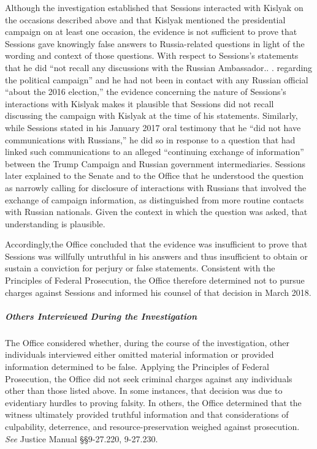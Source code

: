 Although the investigation established that Sessions interacted with Kislyak on the occasions described above and that Kislyak mentioned the presidential campaign on at least one occasion, the evidence is not sufficient to prove that Sessions gave knowingly false answers to Russia-related questions in light of the wording and context of those questions.
With respect to Sessions's statements that he did ``not recall any discussions with the Russian Ambassador.. . regarding the political campaign'' and he had not been in contact with any Russian official ``about the 2016 election,'' the evidence concerning the nature of Sessions's interactions with Kislyak makes it plausible that Sessions did not recall discussing the campaign with Kislyak at the time of his statements.
Similarly, while Sessions stated in his January 2017 oral testimony that he ``did not have communications with Russians,'' he did so in response to a question that had linked such communications to an alleged ``continuing exchange of information'' between the Trump Campaign and Russian government intermediaries.
Sessions later explained to the Senate and to the Office that he understood the question as narrowly calling for disclosure of interactions with Russians that involved the exchange of campaign information, as distinguished from more routine contacts with Russian nationals.
Given the context in which the question was asked, that understanding is plausible.

Accordingly,the Office concluded that the evidence was insufficient to prove that Sessions was willfully untruthful in his answers and thus insufficient to obtain or sustain a conviction for perjury or false statements.
Consistent with the Principles of Federal Prosecution, the Office therefore determined not to pursue charges against Sessions and informed his counsel of that decision in March 2018.

\subparagraph{Others Interviewed During the Investigation}
The Office considered whether, during the course of the investigation, other individuals interviewed either omitted material information or provided information determined to be false.
Applying the Principles of Federal Prosecution, the Office did not seek criminal charges against any individuals other than those listed above.
In some instances, that decision was due to evidentiary hurdles to proving falsity.
In others, the Office determined that the witness ultimately provided truthful information and that considerations of culpability, deterrence, and resource-preservation weighed against prosecution.
\textit{See} Justice Manual \S\S 9-27.220, 9-27.230.






